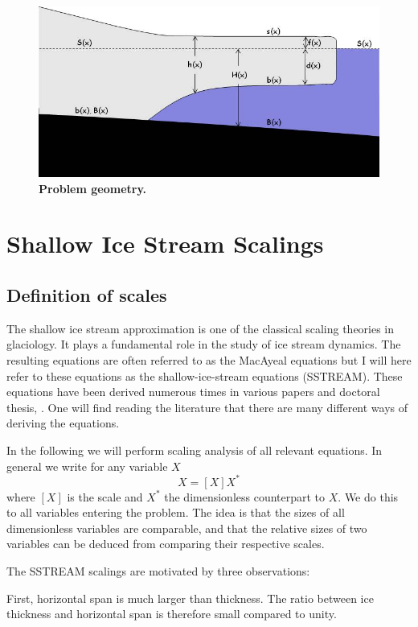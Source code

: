 \documentclass[10pt,a4paper]{book}
\begin{document}
\begin{figure}
\centerline{\includegraphics[width=12cm]{ProblemGeometry.jpg}}
\caption{\bf Problem geometry.
\label{fig:PG}}
\end{figure}


\section{Shallow Ice Stream Scalings}
\subsection{Definition of scales}
The shallow ice stream approximation is one of the classical scaling
theories in glaciology. It plays a fundamental role in the study of
ice stream dynamics. The resulting equations are often referred to
as the MacAyeal equations \cite[]{MAcAyeal1989} but I will here refer to
these equations as the shallow-ice-stream equations (SSTREAM).  These equations
have been derived numerous times in various papers and doctoral
thesis, 
\cite[e.g.][]{Morland:1984,MuszynskiBrichfield:1987,MAcAyeal1989,Baral:1999,Schoof:2006a}.
One will find reading the literature that there are many different
ways of deriving the equations. 

In the following we will perform scaling analysis of all relevant equations. In general we write for any 
variable $X$
\[
X= [X] X^*
\]
where $[X]$ is the scale and $X^*$ the dimensionless counterpart to $X$. We do this to all variables
entering the problem. The idea is that the sizes of all dimensionless variables are comparable, and
that the relative sizes  of two variables can be deduced from comparing their respective scales. 

\smallskip
The SSTREAM scalings are motivated by three observations:

First, horizontal span is much larger than thickness. The ratio between ice thickness and horizontal
span is therefore small compared to unity.
\end{document}
